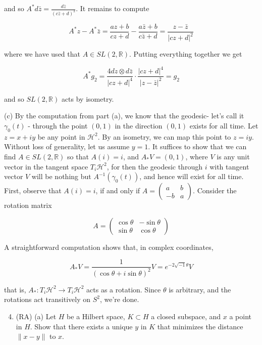 \documentclass[10pt]{article}
\begin{document}
and so $A^{*} d \bar{z}=\frac{d \bar{z}}{(c \bar{z}+d)^{2}}$. It remains to compute

$$
A^{*} z-A^{*} \bar{z}=\frac{a z+b}{c z+d}-\frac{a \bar{z}+b}{c \bar{z}+d}=\frac{z-\bar{z}}{|c z+d|^{2}}
$$

where we have used that $A \in S L(2, \mathbb{R})$. Putting everything together we get

$$
A^{*} g_{2}=\frac{4 d z \otimes d \bar{z}}{|c z+d|^{4}} \cdot \frac{|c z+d|^{4}}{|z-\bar{z}|^{2}}=g_{2}
$$

and so $S L(2, \mathbb{R})$ acts by isometry.

(c) By the computation from part (a), we know that the geodesic- let's call it $\gamma_{0}(t)$ - through the point $(0,1)$ in the direction $(0,1)$ exists for all time. Let $z=x+i y$ be any point in $\mathcal{H}^{2}$. By an isometry, we can map this point to $z=i y$. Without loss of generality, let us assume $y=1$. It suffices to show that we can find $A \in S L(2, \mathbb{R})$ so that $A(i)=i$, and $A_{*} V=(0,1)$, where $V$ is any unit vector in the tangent space $T_{i} \mathcal{H}^{2}$, for then the geodesic through $i$ with tangent vector $V$ will be nothing but $A^{-1}\left(\gamma_{0}(t)\right)$, and hence will exist for all time. First, observe that $A(i)=i$, if and only if $A=\left(\begin{array}{ll}a & b \\ -b & a\end{array}\right)$. Consider the rotation matrix

$$
A=\left(\begin{array}{ll}
\cos \theta & -\sin \theta \\
\sin \theta & \cos \theta
\end{array}\right)
$$

A straightforward computation shows that, in complex coordinates,

$$
A_{*} V=\frac{1}{(\cos \theta+i \sin \theta)^{2}} V=e^{-2 \sqrt{-1} \theta} V
$$

that is, $A_{*}: T_{i} \mathcal{H}^{2} \rightarrow T_{i} \mathcal{H}^{2}$ acts as a rotation. Since $\theta$ is arbitrary, and the rotations act transitively on $S^{2}$, we're done.

\begin{enumerate}
  \setcounter{enumi}{3}
  \item (RA)
(a) Let $H$ be a Hilbert space, $K \subset H$ a closed subspace, and $x$ a point in $H$. Show that there exists a unique $y$ in $K$ that minimizes the distance $\|x-y\|$ to $x$.
\end{enumerate}
\end{document}
